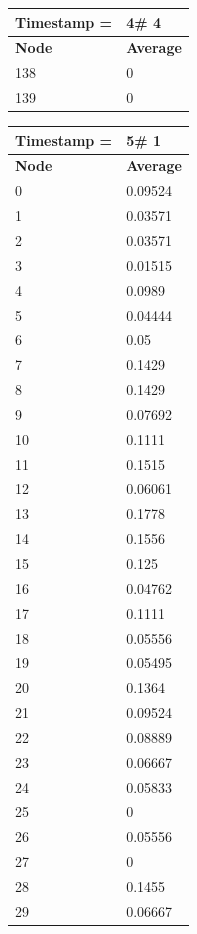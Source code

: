 \begin{tabular}{|l||l|}
\hline
\textbf{Timestamp =} & \textbf{4}\# 4\\\hline
	\textbf{Node} & \textbf{Average} \\ \hline
\hline
	138 & 0 \\ \hline
	139 & 0 \\ \hline
\end{tabular}

\begin{tabular}{|l||l|}
\hline
\textbf{Timestamp =} & \textbf{5}\# 1\\\hline
	\textbf{Node} & \textbf{Average} \\ \hline
\hline
	0 & 0.09524 \\ \hline
	1 & 0.03571 \\ \hline
	2 & 0.03571 \\ \hline
	3 & 0.01515 \\ \hline
	4 & 0.0989 \\ \hline
	5 & 0.04444 \\ \hline
	6 & 0.05 \\ \hline
	7 & 0.1429 \\ \hline
	8 & 0.1429 \\ \hline
	9 & 0.07692 \\ \hline
	10 & 0.1111 \\ \hline
	11 & 0.1515 \\ \hline
	12 & 0.06061 \\ \hline
	13 & 0.1778 \\ \hline
	14 & 0.1556 \\ \hline
	15 & 0.125 \\ \hline
	16 & 0.04762 \\ \hline
	17 & 0.1111 \\ \hline
	18 & 0.05556 \\ \hline
	19 & 0.05495 \\ \hline
	20 & 0.1364 \\ \hline
	21 & 0.09524 \\ \hline
	22 & 0.08889 \\ \hline
	23 & 0.06667 \\ \hline
	24 & 0.05833 \\ \hline
	25 & 0 \\ \hline
	26 & 0.05556 \\ \hline
	27 & 0 \\ \hline
	28 & 0.1455 \\ \hline
	29 & 0.06667 \\ \hline

\end{tabular}
